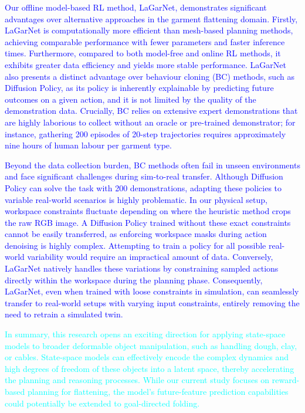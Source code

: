 \documentclass[journal]{IEEEtran}
\newcommand{\addIncremental}[1]{\textcolor{cyan}{#1}}
\newcommand{\addadvantage}[1]{\textcolor{blue}{#1}}
\begin{document}
\addadvantage{Our offline model-based RL method, LaGarNet, demonstrates significant advantages over alternative approaches in the garment flattening domain. Firstly, LaGarNet is computationally more efficient than mesh-based planning methods, achieving comparable performance with fewer parameters and faster inference times. Furthermore, compared to both model-free and online RL methods, it exhibits greater data efficiency and yields more stable performance. LaGarNet also presents a distinct advantage over behaviour cloning (BC) methods, such as Diffusion Policy, as its policy is inherently explainable by predicting future outcomes on a given action, and it is not limited by the quality of the demonstration data. Crucially, BC relies on extensive expert demonstrations that are highly laborious to collect without an oracle or pre-trained demonstrator; for instance, gathering 200 episodes of 20-step trajectories requires approximately nine hours of human labour per garment type.}

\addadvantage{Beyond the data collection burden, BC methods often fail in unseen environments and face significant challenges during sim-to-real transfer. Although Diffusion Policy can solve the task with 200 demonstrations, adapting these policies to variable real-world scenarios is highly problematic. In our physical setup, workspace constraints fluctuate depending on where the heuristic method crops the raw RGB image. A Diffusion Policy trained without these exact constraints cannot be easily transferred, as enforcing workspace masks during action denoising is highly complex. Attempting to train a policy for all possible real-world variability would require an impractical amount of data. Conversely, LaGarNet natively handles these variations by constraining sampled actions directly within the workspace during the planning phase. Consequently, LaGarNet, even when trained with loose constraints in simulation, can seamlessly transfer to real-world setups with varying input constraints, entirely removing the need to retrain a simulated twin.}

\addIncremental{In summary, this research opens an exciting direction for applying state-space models to broader deformable object manipulation, such as handling dough, clay, or cables. State-space models can effectively encode the complex dynamics and high degrees of freedom of these objects into a latent space, thereby accelerating the planning and reasoning processes. While our current study focuses on reward-based planning for flattening, the model's future-feature prediction capabilities could potentially be extended to goal-directed folding.} 
\end{document}
